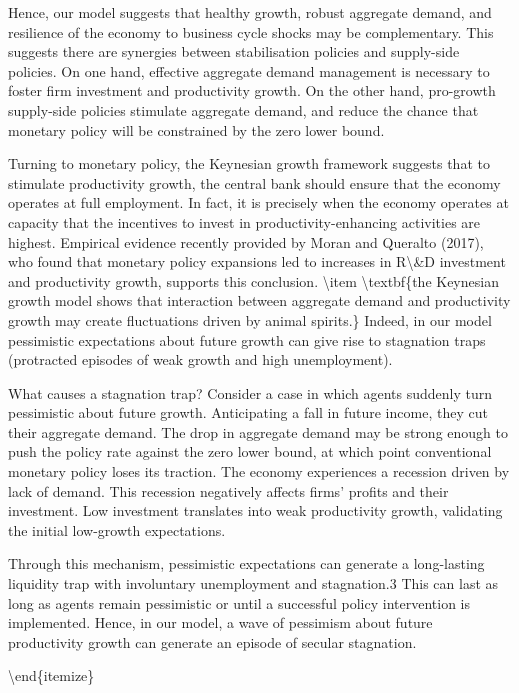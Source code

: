\documentclass[10pt,math=newtx,citestyle=gb7714-2015,bibstyle=gb7714-2015]{elegantbook}
\begin{document}
	Hence, our model suggests that healthy growth, robust aggregate demand, and resilience of the economy to business cycle shocks may be complementary. This suggests there are synergies between stabilisation policies and supply-side policies. On one hand, effective aggregate demand management is necessary to foster firm investment and productivity growth. On the other hand, pro-growth supply-side policies stimulate aggregate demand, and reduce the chance that monetary policy will be constrained by the zero lower bound.
	
	Turning to monetary policy, the Keynesian growth framework suggests that to stimulate productivity growth, the central bank should ensure that the economy operates at full employment. In fact, it is precisely when the economy operates at capacity that the incentives to invest in productivity-enhancing activities are highest. Empirical evidence recently provided by Moran and Queralto (2017), who found that monetary policy expansions led to increases in R\textbackslash{}\&D investment and productivity growth, supports this conclusion.
	\textbackslash{}item \textbackslash{}textbf\{the Keynesian growth model shows that interaction between aggregate demand and productivity growth may create fluctuations driven by animal spirits.\} Indeed, in our model pessimistic expectations about future growth can give rise to stagnation traps (protracted episodes of weak growth and high unemployment).
	
	What causes a stagnation trap? Consider a case in which agents suddenly turn pessimistic about future growth. Anticipating a fall in future income, they cut their aggregate demand. The drop in aggregate demand may be strong enough to push the policy rate against the zero lower bound, at which point conventional monetary policy loses its traction. The economy experiences a recession driven by lack of demand. This recession negatively affects firms' profits and their investment. Low investment translates into weak productivity growth, validating the initial low-growth expectations.
	
	Through this mechanism, pessimistic expectations can generate a long-lasting liquidity trap with involuntary unemployment and stagnation.3 This can last as long as agents remain pessimistic or until a successful policy intervention is implemented. Hence, in our model, a wave of pessimism about future productivity growth can generate an episode of secular stagnation.
	
	\textbackslash{}end\{itemize\}	
	
\end{document}
